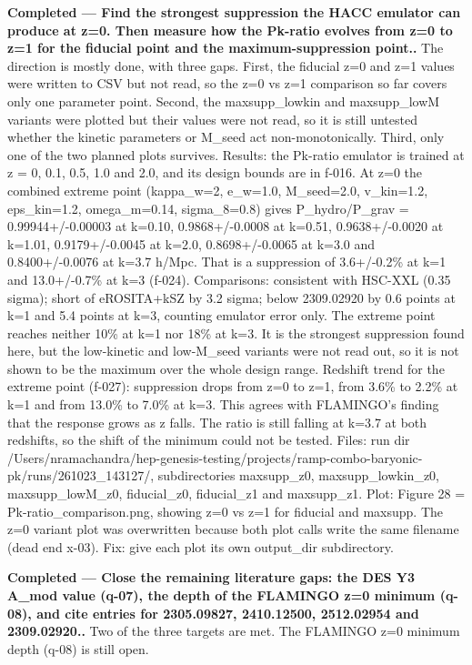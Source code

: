 \documentclass[11pt,a4paper]{article}
\begin{document}
\textbf{Completed --- Find the strongest suppression the HACC emulator can produce at z=0. Then measure how the Pk-ratio evolves from z=0 to z=1 for the fiducial point and the maximum-suppression point..} The direction is mostly done, with three gaps. First, the fiducial z=0 and z=1 values were written to CSV but not read, so the z=0 vs z=1 comparison so far covers only one parameter point. Second, the maxsupp\_lowkin and maxsupp\_lowM variants were plotted but their values were not read, so it is still untested whether the kinetic parameters or M\_seed act non-monotonically. Third, only one of the two planned plots survives. Results: the Pk-ratio emulator is trained at z = 0, 0.1, 0.5, 1.0 and 2.0, and its design bounds are in f-016. At z=0 the combined extreme point (kappa\_w=2, e\_w=1.0, M\_seed=2.0, v\_kin=1.2, eps\_kin=1.2, omega\_m=0.14, sigma\_8=0.8) gives P\_hydro/P\_grav = 0.99944+/-0.00003 at k=0.10, 0.9868+/-0.0008 at k=0.51, 0.9638+/-0.0020 at k=1.01, 0.9179+/-0.0045 at k=2.0, 0.8698+/-0.0065 at k=3.0 and 0.8400+/-0.0076 at k=3.7 h/Mpc. That is a suppression of 3.6+/-0.2\% at k=1 and 13.0+/-0.7\% at k=3 (f-024). Comparisons: consistent with HSC-XXL (0.35 sigma); short of eROSITA+kSZ by 3.2 sigma; below 2309.02920 by 0.6 points at k=1 and 5.4 points at k=3, counting emulator error only. The extreme point reaches neither 10\% at k=1 nor 18\% at k=3. It is the strongest suppression found here, but the low-kinetic and low-M\_seed variants were not read out, so it is not shown to be the maximum over the whole design range. Redshift trend for the extreme point (f-027): suppression drops from z=0 to z=1, from 3.6\% to 2.2\% at k=1 and from 13.0\% to 7.0\% at k=3. This agrees with FLAMINGO's finding that the response grows as z falls. The ratio is still falling at k=3.7 at both redshifts, so the shift of the minimum could not be tested. Files: run dir /Users/nramachandra/hep-genesis-testing/projects/ramp-combo-baryonic-pk/runs/261023\_143127/, subdirectories maxsupp\_z0, maxsupp\_lowkin\_z0, maxsupp\_lowM\_z0, fiducial\_z0, fiducial\_z1 and maxsupp\_z1. Plot: Figure 28 = Pk-ratio\_comparison.png, showing z=0 vs z=1 for fiducial and maxsupp. The z=0 variant plot was overwritten because both plot calls write the same filename (dead end x-03). Fix: give each plot its own output\_dir subdirectory.

\textbf{Completed --- Close the remaining literature gaps: the DES Y3 A\_mod value (q-07), the depth of the FLAMINGO z=0 minimum (q-08), and cite entries for 2305.09827, 2410.12500, 2512.02954 and 2309.02920..} Two of the three targets are met. The FLAMINGO z=0 minimum depth (q-08) is still open.
\end{document}

